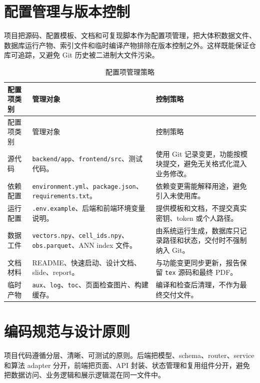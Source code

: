 \documentclass[UTF8,a4paper,12pt]{ctexrep}
\begin{document}
\section{配置管理与版本控制}

项目把源码、配置模板、文档和可复现脚本作为配置项管理，把大体积数据文件、数据库运行产物、索引文件和临时编译产物排除在版本控制之外。这样既能保证仓库可追踪，又避免 Git 历史被二进制大文件污染。

\begin{longtable}{@{}L{0.18\textwidth}L{0.36\textwidth}L{0.36\textwidth}@{}}
  \caption{配置项管理策略} \\
  \toprule
  配置项类别 & 管理对象 & 控制策略 \\
  \midrule
  \endfirsthead
  \toprule
  配置项类别 & 管理对象 & 控制策略 \\
  \midrule
  \endhead
  源代码 & \texttt{backend/app}、\texttt{frontend/src}、测试代码。 & 使用 Git 记录变更，功能按模块提交，避免无关格式化混入业务修改。 \\
  依赖配置 & \texttt{environment.yml}、\texttt{package.json}、\texttt{requirements.txt}。 & 依赖变更需能解释用途，避免引入未使用库。 \\
  运行配置 & \texttt{.env.example}、后端和前端环境变量说明。 & 提供模板和文档，不提交真实密钥、token 或个人路径。 \\
  数据工件 & \texttt{vectors.npy}、\texttt{cell\_ids.npy}、\texttt{obs.parquet}、ANN index 文件。 & 由系统运行生成，数据库只记录路径和状态，交付时不强制纳入 Git。 \\
  文档材料 & README、快速启动、设计文档、slide、report。 & 与功能变更同步更新，报告保留 \texttt{tex} 源码和最终 PDF。 \\
  临时产物 & \texttt{aux}、\texttt{log}、\texttt{toc}、页面检查图片、构建缓存。 & 编译和检查后清理，不作为最终交付文件。 \\
  \bottomrule
\end{longtable}

\section{编码规范与设计原则}

项目代码遵循分层、清晰、可测试的原则。后端把模型、schema、router、service 和算法 adapter 分开，前端把页面、API 封装、状态管理和复用组件分开，避免把数据访问、业务逻辑和展示逻辑混在同一文件中。
\end{document}
